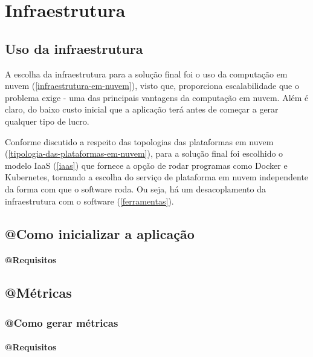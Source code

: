 \chapter{Infraestrutura}

\section{Uso da infraestrutura}

A escolha da infraestrutura para a solução final foi o uso da
computação em nuvem (\autoref{infraestrutura-em-nuvem}), visto que, proporciona
escalabilidade que o problema exige - uma das principais vantagens da computação em nuvem.
Além é claro, do baixo custo inicial que a aplicação terá antes de começar a gerar qualquer
tipo de lucro.

Conforme discutido a respeito das topologias das plataformas em
nuvem (\autoref{tipologia-das-plataformas-em-nuvem}), para a solução final foi escolhido o
modelo IaaS (\autoref{iaas}) que fornece a opção de rodar programas como Docker e
Kubernetes, tornando a escolha do serviço de plataforma em nuvem independente da forma
com que o software roda. Ou seja, há um desacoplamento da infraestrutura com o software
(\autoref{ferramentas}).

\section{@Como inicializar a aplicação}

\subsubsection{@Requisitos}

\section{@Métricas}

\subsection{@Como gerar métricas}

\subsubsection{@Requisitos}

